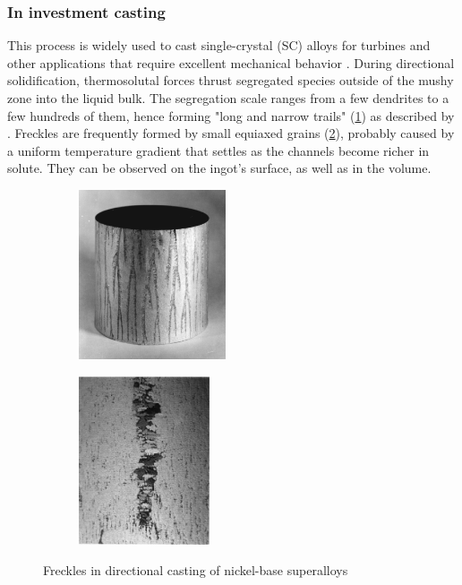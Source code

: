 \subsubsection*{In investment casting}
%
This process is widely used to cast single-crystal (SC) alloys for turbines and other applications 
that require excellent mechanical behavior \citep{giamei_nature_1970}.
During directional solidification, thermosolutal forces thrust segregated species outside of the 
mushy zone into the liquid bulk. The segregation scale ranges from a few dendrites to a few hundreds 
of them, hence forming "long and narrow trails" (\cref{fig:freckle1}) as described by \citet{felicelli_simulation_1991}. 
Freckles are frequently formed by small equiaxed grains (\cref{fig:freckle2}), probably caused by a uniform temperature gradient 
that settles as the channels become richer in solute. They can be observed on the ingot's surface, as well as in the volume.
\begin{figure}[htbp]
\centering
  \begin{subfigure}[t]{0.25\textwidth}
    \centering
	\includegraphics[height=5cm]{Chapter0/Graphics/freckle1.png}
	\caption{} %
    \label{fig:freckle1}
  \end{subfigure}
   \qquad %
   \begin{subfigure}[t]{0.25\textwidth}
    \centering
	\includegraphics[height=5cm]{Chapter0/Graphics/freckle2.png}
	\caption{} %
    \label{fig:freckle2}
  \end{subfigure}
\caption{Freckles in directional casting of nickel-base superalloys} 
\label{fig:freckle}
\end{figure}
%
